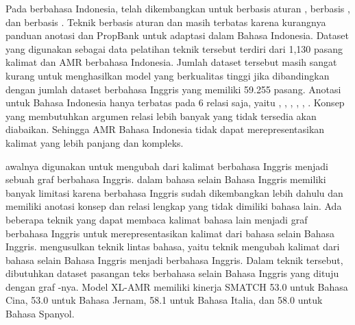Pada \AMR{} berbahasa Indonesia, telah dikembangkan untuk  berbasis aturan , berbasis  , dan berbasis \crosslingual{} .
Teknik \amrparsing{} berbasis aturan dan  masih terbatas karena kurangnya panduan anotasi dan PropBank untuk adaptasi \AMR{} dalam Bahasa Indonesia.
Dataset yang digunakan sebagai data pelatihan teknik tersebut terdiri dari 1,130 pasang kalimat dan AMR berbahasa Indonesia.
Jumlah dataset tersebut masih sangat kurang untuk menghasilkan model yang berkualitas tinggi jika dibandingkan dengan jumlah dataset berbahasa Inggris yang memiliki 59.255 pasang.
Anotasi untuk \AMR{} Bahasa Indonesia hanya terbatas pada 6 relasi saja, yaitu , , , , ,  .
Konsep yang membutuhkan argumen relasi lebih banyak yang tidak tersedia akan diabaikan.
Sehingga AMR Bahasa Indonesia tidak dapat merepresentasikan kalimat yang lebih panjang dan kompleks.

\amrparsing{} awalnya digunakan untuk mengubah dari kalimat berbahasa Inggris menjadi sebuah graf \AMR{} berbahasa Inggris.
\AMR{} dalam bahasa selain Bahasa Inggris memiliki banyak limitasi karena \AMR{} berbahasa Inggris sudah dikembangkan lebih dahulu dan memiliki anotasi konsep dan relasi lengkap yang tidak dimiliki \AMR{} bahasa lain.
Ada beberapa teknik yang dapat membaca kalimat bahasa lain menjadi graf \AMR{} berbahasa Inggris untuk merepresentasikan kalimat dari bahasa selain Bahasa Inggris.
\textcite{damonte2018} mengusulkan teknik \amrparsing{} lintas bahasa, yaitu teknik mengubah kalimat dari bahasa selain Bahasa Inggris menjadi \AMR{} berbahasa Inggris.
Dalam teknik tersebut, dibutuhkan dataset pasangan teks berbahasa selain Bahasa Inggris yang dituju dengan graf \AMR{}-nya.
Model \gls{XL-AMR} memiliki kinerja SMATCH 53.0 untuk Bahasa Cina, 53.0 untuk Bahasa Jernam, 58.1 untuk Bahasa Italia, dan 58.0 untuk Bahasa Spanyol.

